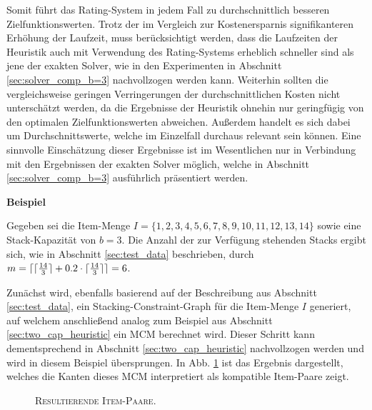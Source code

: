 Somit führt das Rating-System in jedem Fall zu durchschnittlich besseren Zielfunktionswerten.
Trotz der im Vergleich zur Kostenersparnis signifikanteren Erhöhung der Laufzeit, muss berücksichtigt werden,
dass die Laufzeiten der Heuristik auch mit Verwendung des Rating-Systems erheblich schneller sind als jene der
exakten Solver, wie in den Experimenten in Abschnitt \ref{sec:solver_comp_b=3} nachvollzogen werden kann.
Weiterhin sollten die vergleichsweise geringen Verringerungen der durchschnittlichen Kosten nicht unterschätzt werden,
da die Ergebnisse der Heuristik ohnehin nur geringfügig von den optimalen Zielfunktionswerten abweichen.
Außerdem handelt es sich dabei um Durchschnittswerte, welche im Einzelfall durchaus relevant sein können.
Eine sinnvolle Einschätzung dieser Ergebnisse ist im Wesentlichen nur in Verbindung mit den Ergebnissen der exakten Solver
möglich, welche in Abschnitt \ref{sec:solver_comp_b=3} ausführlich präsentiert werden.

\vfill
\pagebreak

\textbf{Beispiel}

Gegeben sei die Item-Menge $I = \{1, 2, 3, 4, 5, 6, 7, 8, 9, 10, 11, 12, 13, 14\}$ sowie eine Stack-Kapazität von $b = 3$.
Die Anzahl der zur Verfügung stehenden Stacks ergibt sich, wie in Abschnitt \ref{sec:test_data} beschrieben,
durch $m = \lceil\lceil\frac{14}{3}\rceil + 0.2 \cdot  \lceil\frac{14}{3}\rceil\rceil = 6$.

Zunächst wird, ebenfalls basierend auf der Beschreibung aus Abschnitt \ref{sec:test_data}, ein Stacking-Constraint-Graph
für die Item-Menge $I$ generiert, auf welchem anschließend analog zum Beispiel aus Abschnitt \ref{sec:two_cap_heuristic} ein
\textsc{MCM} berechnet wird. Dieser Schritt kann dementsprechend in Abschnitt \ref{sec:two_cap_heuristic} nachvollzogen werden
und wird in diesem Beispiel übersprungen. In Abb. \ref{fig:item_pairs_example_b=3} ist das Ergebnis dargestellt,
welches die Kanten dieses \textsc{MCM} interpretiert als kompatible Item-Paare zeigt.

\begin{figure}[H]
\centering
{}
\caption{\textsc{Resultierende Item-Paare}.}
\label{fig:item_pairs_example_b=3}
\end{figure}

